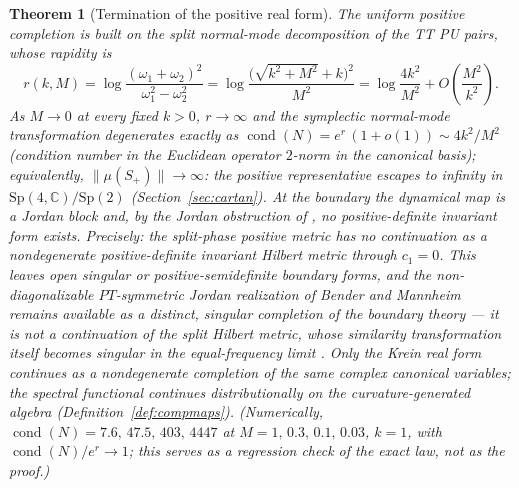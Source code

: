 \documentclass[11pt]{article}
\newtheorem{theorem}{Theorem}[section]
\theoremstyle{definition}
\theoremstyle{remark}
\newcommand{\C}{\mathbb{C}}
\newcommand{\w}{\omega}
\newcommand{\Sp}{\mathrm{Sp}}
\begin{document}
\begin{theorem}[Termination of the positive real form]\label{thm:term}
The uniform positive completion is built on the split normal-mode
decomposition of the TT PU pairs, whose rapidity is
\begin{equation}
r(k,M)=\log\frac{(\w_1+\w_2)^2}{\w_1^2-\w_2^2}
=\log\frac{\big(\sqrt{k^2+M^2}+k\big)^2}{M^2}
=\log\frac{4k^2}{M^2}+O\!\left(\frac{M^2}{k^2}\right).
\end{equation}
As $M\to0$ at every fixed $k>0$, $r\to\infty$ and the symplectic
normal-mode transformation degenerates exactly as
$\operatorname{cond}(N)=e^{r}\,(1+o(1))\sim4k^2/M^2$ (condition number in
the Euclidean operator $2$-norm in the canonical basis); equivalently,
$\|\mu(S_+)\|\to\infty$: the positive representative escapes to infinity
in $\Sp(4,\C)/\Sp(2)$ (Section~\ref{sec:cartan}).  At the boundary the
dynamical map is a Jordan block and, by the Jordan obstruction of
\cite{companion1}, no positive-definite invariant form exists.
Precisely: the split-phase positive metric has \emph{no continuation as a
nondegenerate positive-definite invariant Hilbert metric} through
$c_1=0$.  This leaves open singular or positive-semidefinite boundary
forms, and the non-diagonalizable $PT$-symmetric Jordan realization of
Bender and Mannheim \cite{BM2008Jordan,Mannheim2021} remains available
\emph{as a distinct, singular completion of the boundary theory} --- it
is not a continuation of the split Hilbert metric, whose similarity
transformation itself becomes singular in the equal-frequency limit
\cite{BM2008Jordan}.  Only the Krein real form continues as a
nondegenerate completion of the same complex canonical variables; the
spectral functional continues distributionally on the curvature-generated
algebra (Definition~\ref{def:compmaps}).  (Numerically,
$\operatorname{cond}(N)=7.6,\,47.5,\,403,\,4447$ at
$M=1,\,0.3,\,0.1,\,0.03$, $k=1$, with
$\operatorname{cond}(N)/e^{r}\to1$; this serves as a regression check of
the exact law, not as the proof.)
\end{theorem}
\end{document}
